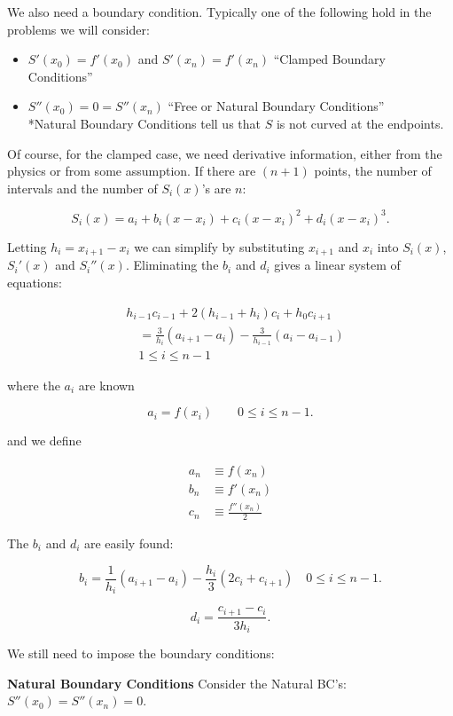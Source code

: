 We also need a boundary condition. Typically one of the following hold in the
problems we will consider: 

\begin{itemize}
  \item $S'(x_0) = f'(x_0)$ and $S'(x_n) = f'(x_n)$ 
    \enquote{Clamped Boundary Conditions}
  \item $S''(x_0) = 0 = S''(x_n)$
    \enquote{Free or Natural Boundary Conditions} \\
    \small{
    *Natural Boundary Conditions tell us that $S$ is not curved at the endpoints.
  }
\end{itemize}

Of course, for the clamped case, we need derivative information, either from the
physics or from some assumption. If there are $(n+1)$ points, the number of
intervals and the number of $S_i(x)$'s are $n:$

\[
  S_i(x) = a_i + b_i (x-x_i) + c_i (x-x_i)^2 + d_i (x-x_i)^3
.\]

Letting $h_i = x_{i+1} - x_i$  we can simplify by substituting $x_{i+1}$ and
$x_i$ into $S_i(x)$, $S_i'(x)$ and $S_i''(x)$. Eliminating the $b_i$ and $d_i$
gives a linear system of equations:

\begin{align*}
&h_{i-1}c_{i-1} + 2(h_{i-1} + h_i)c_i + h_0 c_{i+1} \\
&\quad= \frac{3}{h_i}(a_{i+1}-a_i) - \frac{3}{h_{i-1}}(a_i - a_{i-1})\\
&\quad 1 \leq i \leq n-1
\end{align*}

where the $a_i$ are known

\[
  a_i = f(x_i) \qquad 0 \leq i \leq n-1
.\]

and we define 

\begin{align*}
  a_n &\equiv f(x_n) \\
  b_n &\equiv f'(x_n) \\
  c_n &\equiv \frac{f''(x_n)}{2}
\end{align*}

The $b_i$ and $d_i$ are easily found:

\[
  b_i = \frac{1}{h_i}(a_{i+1} - a_i) - \frac{h_i}{3} (2c_i + c_{i+1}) \quad 0 \leq i \leq n-1
.\]

\[
  d_i = \frac{c_{i+1} - c_i}{3h_i}
.\]

We still need to impose the boundary conditions:

\textbf{Natural Boundary Conditions}
Consider the Natural BC's: $S''(x_0) = S''(x_n) = 0$.

